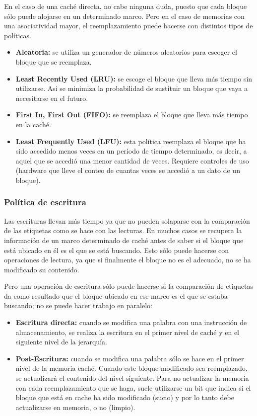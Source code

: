 En el caso de una caché directa, no cabe ninguna duda, puesto que cada bloque sólo puede alojarse en un determinado marco. Pero en el caso de memorias con una asociatividad mayor, el reemplazamiento puede hacerse con distintos tipos de políticas.

\begin{itemize}
  \item \textbf{Aleatoria:} se utiliza un generador de números aleatorios para escoger el bloque que se reemplaza.
  \item \textbf{Least Recently Used (LRU):} se escoge el bloque que lleva más tiempo sin utilizarse. Asi se minimiza la probabilidad de sustituir un bloque que vaya a necesitarse en el futuro.
  \item \textbf{First In, First Out (FIFO):} se reemplaza el bloque que lleva más tiempo en la caché.
  \item \textbf{Least Frequently Used (LFU):} esta política reemplaza el bloque que ha sido accedido menos veces en un período de tiempo determinado, es decir, a aquel que se accedió una menor cantidad de veces. Requiere controles de uso (hardware que lleve el conteo de cuantas veces se accedió a un dato de un bloque).
\end{itemize}

\subsubsection*{Política de escritura}

Las escrituras llevan más tiempo ya que no pueden solaparse con la comparación de las etiquetas como se hace con las lecturas. En muchos casos se recupera la información de un marco determinado de caché antes de saber si el bloque que está ubicado en él es el que se está buscando. Esto sólo puede hacerse con operaciones de lectura, ya que si finalmente el bloque no es el adecuado, no se ha modificado su contenido.

Pero una operación de escritura sólo puede hacerse si la comparación de etiquetas da como resultado que el bloque ubicado en ese marco es el que se estaba buscando; no se puede hacer trabajo en paralelo:

\begin{itemize}
  \item \textbf{Escritura directa:} cuando se modifica una palabra con una instrucción de almacenamiento, se realiza la escritura en el primer nivel de caché y en el siguiente nivel de la jerarquía.
  \item \textbf{Post-Escritura:} cuando se modifica una palabra sólo se hace en el primer nivel de la memoria caché. Cuando este bloque modificado sea reemplazado, se actualizará el contenido del nivel siguiente. Para no actualizar la memoria con cada reemplazamiento que se haga, suele utilizarse un bit que indica si el bloque que está en cache ha sido modificado (sucio) y por lo tanto debe actualizarse en memoria, o no (limpio).
\end{itemize}

